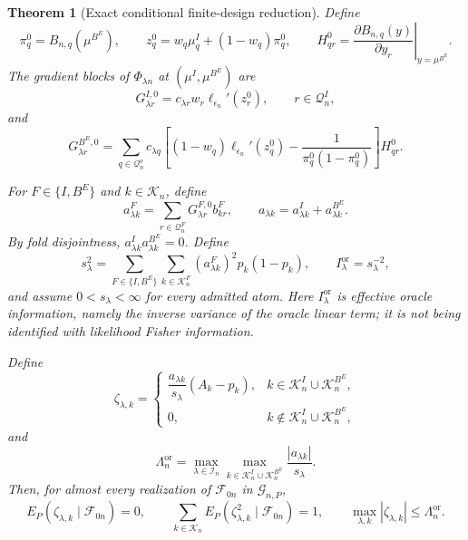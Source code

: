 \documentclass[11pt]{article}
\newtheorem{theorem}{Theorem}[section]
\theoremstyle{definition}
\newcommand{\1}{\mathbf 1}\newcommand{\op}{\operatorname}
\begin{document}
\begin{theorem}[Exact conditional finite-design reduction]
Define
\begin{equation}
\pi_q^0
=
B_{n,q}(\mu^{B^E}),
\qquad
z_q^0
=
w_q\mu_q^I+(1-w_q)\pi_q^0,
\qquad
H_{qr}^0
=
\left.
\frac{\partial B_{n,q}(y)}{\partial y_r}
\right|_{y=\mu^{B^E}}.
\label{eq:oracle-map-quantities-final}
\end{equation}
The gradient blocks of $\Phi_{\lambda n}$ at
$(\mu^I,\mu^{B^E})$ are
\begin{equation}
G_{\lambda r}^{I,0}
=
c_{\lambda r}w_r
\ell_{\epsilon_n}'(z_r^0),
\qquad
r\in\mathcal Q_n^I,
\label{eq:oracle-gradient-I-final}
\end{equation}
and
\begin{equation}
G_{\lambda r}^{B^E,0}
=
\sum_{q\in\mathcal Q_n^o}
c_{\lambda q}
\left[
(1-w_q)\ell_{\epsilon_n}'(z_q^0)
-
\frac{1}{\pi_q^0(1-\pi_q^0)}
\right]H_{qr}^0.
\label{eq:oracle-gradient-BE-final}
\end{equation}

For $F\in\{I,B^E\}$ and $k\in\mathcal K_n$, define
\begin{equation}
a_{\lambda k}^F
=
\sum_{r\in\mathcal Q_n^F}
G_{\lambda r}^{F,0}b_{kr}^F,
\qquad
a_{\lambda k}
=
a_{\lambda k}^I+a_{\lambda k}^{B^E}.
\label{eq:oracle-loadings-final}
\end{equation}
By fold disjointness,
$a_{\lambda k}^Ia_{\lambda k}^{B^E}=0$. Define
\begin{equation}
s_\lambda^2
=
\sum_{F\in\{I,B^E\}}
\sum_{k\in\mathcal K_n^F}
(a_{\lambda k}^F)^2p_k(1-p_k),
\qquad
I_\lambda^{\mathrm{or}}=s_\lambda^{-2},
\label{eq:oracle-variance-final}
\end{equation}
and assume $0<s_\lambda<\infty$ for every admitted atom.
Here $I_\lambda^{\mathrm{or}}$ is effective oracle information,
namely the inverse variance of the oracle linear term; it is not
being identified with likelihood Fisher information.

Define
\begin{equation}
\zeta_{\lambda,k}
=
\begin{cases}
\dfrac{a_{\lambda k}}{s_\lambda}(A_k-p_k),
&
k\in\mathcal K_n^I\cup\mathcal K_n^{B^E},
\\[6pt]
0,
&
k\notin\mathcal K_n^I\cup\mathcal K_n^{B^E},
\end{cases}
\label{eq:oracle-influence-final}
\end{equation}
and
\begin{equation}
\Lambda_n^{\mathrm{or}}
=
\max_{\lambda\in\mathcal I_n}
\max_{k\in\mathcal K_n^I\cup\mathcal K_n^{B^E}}
\frac{|a_{\lambda k}|}{s_\lambda}.
\label{eq:oracle-leverage-final}
\end{equation}
Then, for almost every realization of $\mathcal F_{0n}$ in
$\mathcal G_{n,P}$,
\begin{equation}
E_P(\zeta_{\lambda,k}\mid\mathcal F_{0n})=0,
\qquad
\sum_{k\in\mathcal K_n}
E_P(\zeta_{\lambda,k}^2\mid\mathcal F_{0n})=1,
\qquad
\max_{\lambda,k}|\zeta_{\lambda,k}|
\le\Lambda_n^{\mathrm{or}}.
\label{eq:influence-properties-final}
\end{equation}


\end{theorem}
\end{document}
